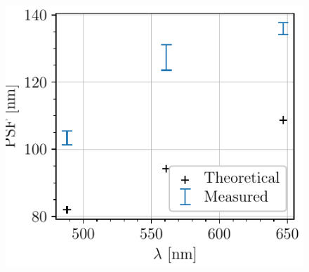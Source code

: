 \begin{figure}
    \centering
    \includegraphics[scale=1]{figures/comparison_PSF.pdf}
\end{figure}

